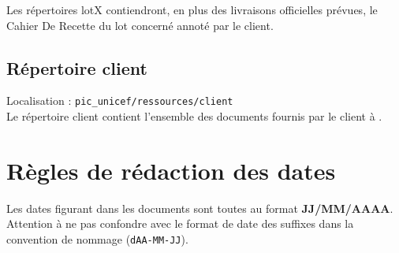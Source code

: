Les répertoires lotX contiendront, en plus des livraisons officielles prévues, le Cahier De Recette du lot concerné annoté par le client.

\subsection{Répertoire client}

Localisation : \verb+pic_unicef/ressources/client+\\

Le répertoire client contient l’ensemble des documents fournis par le client à \nomEquipe.


\section{Règles de rédaction des dates}

Les dates figurant dans les documents sont toutes au format \textbf{JJ/MM/AAAA}. Attention à ne pas confondre avec le format de date des  suffixes dans la convention de nommage (\verb+dAA-MM-JJ+).

